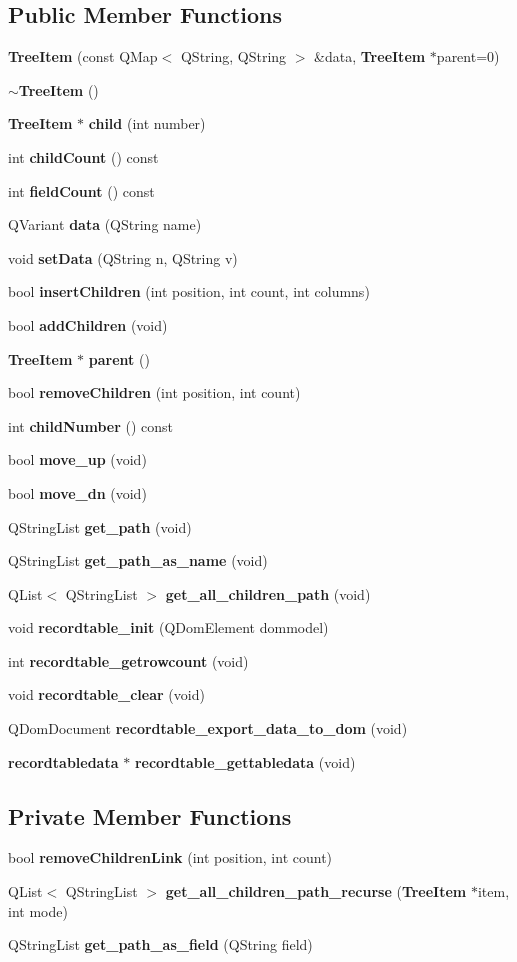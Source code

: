 \subsection*{Public Member Functions}
\begin{CompactItemize}
\item 
{\bf Tree\-Item} (const QMap$<$ QString, QString $>$ \&data, {\bf Tree\-Item} $\ast$parent=0)
\item 
{\bf $\sim$Tree\-Item} ()
\item 
{\bf Tree\-Item} $\ast$ {\bf child} (int number)
\item 
int {\bf child\-Count} () const
\item 
int {\bf field\-Count} () const
\item 
QVariant {\bf data} (QString name)
\item 
void {\bf set\-Data} (QString n, QString v)
\item 
bool {\bf insert\-Children} (int position, int count, int columns)
\item 
bool {\bf add\-Children} (void)
\item 
{\bf Tree\-Item} $\ast$ {\bf parent} ()
\item 
bool {\bf remove\-Children} (int position, int count)
\item 
int {\bf child\-Number} () const
\item 
bool {\bf move\_\-up} (void)
\item 
bool {\bf move\_\-dn} (void)
\item 
QString\-List {\bf get\_\-path} (void)
\item 
QString\-List {\bf get\_\-path\_\-as\_\-name} (void)
\item 
QList$<$ QString\-List $>$ {\bf get\_\-all\_\-children\_\-path} (void)
\item 
void {\bf recordtable\_\-init} (QDom\-Element dommodel)
\item 
int {\bf recordtable\_\-getrowcount} (void)
\item 
void {\bf recordtable\_\-clear} (void)
\item 
QDom\-Document {\bf recordtable\_\-export\_\-data\_\-to\_\-dom} (void)
\item 
{\bf recordtabledata} $\ast$ {\bf recordtable\_\-gettabledata} (void)
\end{CompactItemize}
\subsection*{Private Member Functions}
\begin{CompactItemize}
\item 
bool {\bf remove\-Children\-Link} (int position, int count)
\item 
QList$<$ QString\-List $>$ {\bf get\_\-all\_\-children\_\-path\_\-recurse} ({\bf Tree\-Item} $\ast$item, int mode)
\item 
QString\-List {\bf get\_\-path\_\-as\_\-field} (QString field)
\end{CompactItemize}
